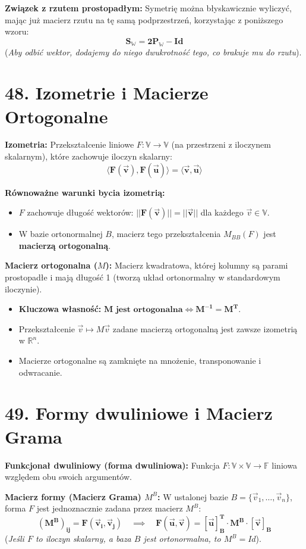 \documentclass[12pt,a4paper]{article}
\begin{document}
\noindent\textbf{Związek z rzutem prostopadłym:} Symetrię można błyskawicznie wyliczyć, mając już macierz rzutu na tę samą podprzestrzeń, korzystając z poniższego wzoru: %
$$ \mathbf{S_{\mathbb{W}} = 2P_{\mathbb{W}} - Id} $$ %
(\textit{Aby odbić wektor, dodajemy do niego dwukrotność tego, co brakuje mu do rzutu}).

\section*{48. Izometrie i Macierze Ortogonalne}
\noindent\textbf{Izometria:} Przekształcenie liniowe $F: \mathbb{V} \to \mathbb{V}$ (na przestrzeni z iloczynem skalarnym), które zachowuje iloczyn skalarny: %
$$ \mathbf{\langle F(\vec{v}), F(\vec{u}) \rangle = \langle \vec{v}, \vec{u} \rangle} $$ %

\noindent\textbf{Równoważne warunki bycia izometrią:} %
\begin{itemize}
    \item $F$ zachowuje długość wektorów: $\mathbf{||F(\vec{v})|| = ||\vec{v}||}$ dla każdego $\vec{v} \in \mathbb{V}$. %
    \item W bazie ortonormalnej $B$, macierz tego przekształcenia $M_{BB}(F)$ jest \textbf{macierzą ortogonalną}. %
\end{itemize}

\noindent\textbf{Macierz ortogonalna ($M$):} Macierz kwadratowa, której kolumny są parami prostopadłe i mają długość 1 (tworzą układ ortonormalny w standardowym iloczynie). %
\begin{itemize}
    \item \textbf{Kluczowa własność:} $\mathbf{M \text{ jest ortogonalna} \iff M^{-1} = M^T}$. %
    \item Przekształcenie $\vec{v} \mapsto M\vec{v}$ zadane macierzą ortogonalną jest zawsze izometrią w $\mathbb{R}^n$. %
    \item Macierze ortogonalne są zamknięte na mnożenie, transponowanie i odwracanie. %
\end{itemize}

\section*{49. Formy dwuliniowe i Macierz Grama}
\noindent\textbf{Funkcjonał dwuliniowy (forma dwuliniowa):} Funkcja $F: \mathbb{V} \times \mathbb{V} \to \mathbb{F}$ liniowa względem obu swoich argumentów. %

\noindent\textbf{Macierz formy (Macierz Grama) $M^B$:} W ustalonej bazie $B = \{\vec{v}_1, \dots, \vec{v}_n\}$, forma $F$ jest jednoznacznie zadana przez macierz $M^B$: %
$$ \mathbf{(M^B)_{ij} = F(\vec{v}_i, \vec{v}_j)} \quad \implies \quad \mathbf{F(\vec{u}, \vec{v}) = [\vec{u}]_B^T \cdot M^B \cdot [\vec{v}]_B} $$ %
(\textit{Jeśli $F$ to iloczyn skalarny, a baza $B$ jest ortonormalna, to $M^B = Id$}). %
\end{document}

